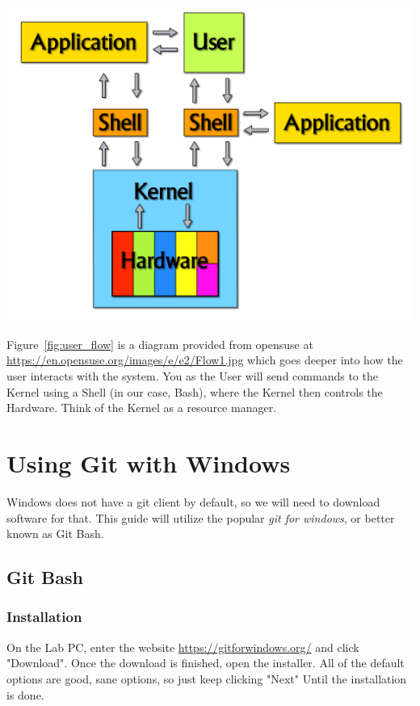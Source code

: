 \documentclass[12pt]{article}
\begin{document}
\begin{center}
    \includegraphics[scale=0.4]{Flow1.jpg}
    \label{fig:user_flow}
\end{center}

Figure~\ref{fig:user_flow} is a diagram provided from opensuse at \href{https://en.opensuse.org/images/e/e2/Flow1.jpg}{https://en.opensuse.org/images/e/e2/Flow1.jpg} which goes deeper into how the user interacts with the system. You as the User will send commands to the Kernel using a Shell (in our case, Bash), where the Kernel then controls the Hardware. Think of the Kernel as a resource manager.

\section{Using Git with Windows} \label{Using Git with Windows}
Windows does not have a git client by default, so we will need to download software for that. This guide will utilize the popular \emph{git for windows}, or better known as Git Bash.
\subsection{Git Bash}
\subsubsection{Installation} \label{Win10-GitBashInstall}
On the Lab PC, enter the website \url{https://gitforwindows.org/} and click "Download". Once the download is finished, open the installer. All of the default options are good, sane options, so just keep clicking "Next" Until the installation is done.
\end{document}
